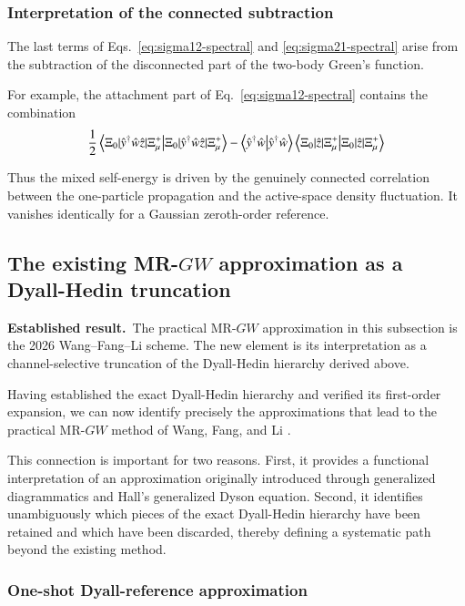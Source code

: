 \documentclass[aip,jcp,reprint,noshowkeys,superscriptaddress]{revtex4-1}
\newcommand{\Established}{\textbf{Established result.}\ }
\begin{document}
\subsubsection{Interpretation of the connected subtraction}

The last terms of Eqs.~\eqref{eq:sigma12-spectral} and
\eqref{eq:sigma21-spectral} arise from the subtraction of the
disconnected part of the two-body Green's function.

For example, the attachment part of
Eq.~\eqref{eq:sigma12-spectral} contains the combination
\begin{equation}
  \frac{1}{2}
  \braket{
    \Xi_0
    |
    \hat y^\dagger\hat w\hat z
    |
    \Xi_\mu^{+}
  }
  -
  \braket{
    \hat y^\dagger\hat w
  }
  \braket{
    \Xi_0
    |
    \hat z
    |
    \Xi_\mu^{+}
  }
\end{equation}

Thus the mixed self-energy is driven by the genuinely connected
correlation between the one-particle propagation and the active-space
density fluctuation.  It vanishes identically for a Gaussian
zeroth-order reference.
\subsection{The existing MR-\texorpdfstring{$GW$}{GW} approximation as a Dyall-Hedin truncation}
\label{sec:mr-gw-from-hedin}

\Established The practical MR-$GW$ approximation in this subsection is
the 2026 Wang--Fang--Li scheme.  The new element is its interpretation as a
channel-selective truncation of the Dyall-Hedin hierarchy derived above.


Having established the exact Dyall-Hedin hierarchy and verified its
first-order expansion, we can now identify precisely the approximations
that lead to the practical MR-$GW$ method of Wang, Fang, and Li
\cite{WangFangLi2026}.

This connection is important for two reasons.  First, it provides a
functional interpretation of an approximation originally introduced
through generalized diagrammatics and Hall's generalized Dyson
equation.  Second, it identifies unambiguously which pieces of the exact
Dyall-Hedin hierarchy have been retained and which have been discarded,
thereby defining a systematic path beyond the existing method.


\subsubsection{One-shot Dyall-reference approximation}
\end{document}
